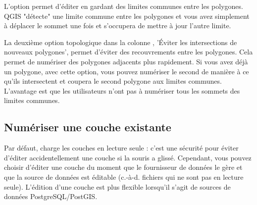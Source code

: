 
L'option  permet d'éditer en gardant 
des limites communes entre les polygones. QGIS "détecte" une limite commune entre 
les polygones et vous avez simplement à déplacer le sommet une fois et \qg 
s'occupera de mettre à jour l'autre limite.


La deuxième option topologique dans la colonne , 
'Éviter les intersections de nouveaux polygones', permet d'éviter des 
recouvrements entre les polygones. Cela permet de numériser des polygones 
adjacents plus rapidement. Si vous avez déjà un polygone, avec cette option, 
vous pouvez numériser le second de manière à ce qu'ils intersectent et \qg 
coupera le second polygone aux limites communes. L'avantage est que les 
utilisateurs n'ont pas à numériser tous les sommets des limites communes.

\subsection{Numériser une couche existante}
\label{sec:edit_existing_layer}

Par défaut, \qg charge les couches en lecture seule : c'est une sécurité pour 
éviter d'éditer accidentellement une couche si la souris a glissé. Cependant, 
vous pouvez choisir d'éditer une couche du moment que le fournisseur de données 
le gère et que la source de données est éditable (c.-à-d. fichiers qui ne sont 
pas en lecture seule). 
L'édition d'une couche est plus flexible lorsqu'il s'agit de sources de données 
PostgreSQL/PostGIS.

